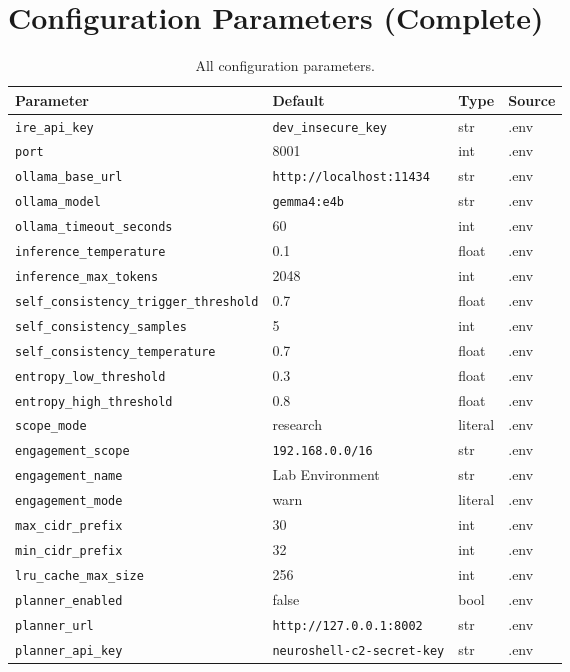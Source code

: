 \documentclass[10pt,journal,onecolumn]{IEEEtran}
\begin{document}
\section{Configuration Parameters (Complete)}
\begin{table}[t]
\caption{All configuration parameters.}
\label{tab:appH}
\begin{tabularx}{\textwidth}{>{\ttfamily}l X l l}
\toprule
\textbf{Parameter} & \textbf{Default} & \textbf{Type} & \textbf{Source}\\
\midrule
\texttt{ire\_api\_key} & \texttt{dev\_insecure\_key} & str & .env\\
\texttt{port} & 8001 & int & .env\\
\texttt{ollama\_base\_url} & \texttt{http://localhost:11434} & str & .env\\
\texttt{ollama\_model} & \texttt{gemma4:e4b} & str & .env\\
\texttt{ollama\_timeout\_seconds} & 60 & int & .env\\
\texttt{inference\_temperature} & 0.1 & float & .env\\
\texttt{inference\_max\_tokens} & 2048 & int & .env\\
\texttt{self\_consistency\_trigger\_threshold} & 0.7 & float & .env\\
\texttt{self\_consistency\_samples} & 5 & int & .env\\
\texttt{self\_consistency\_temperature} & 0.7 & float & .env\\
\texttt{entropy\_low\_threshold} & 0.3 & float & .env\\
\texttt{entropy\_high\_threshold} & 0.8 & float & .env\\
\texttt{scope\_mode} & research & literal & .env\\
\texttt{engagement\_scope} & \texttt{192.168.0.0/16} & str & .env\\
\texttt{engagement\_name} & Lab Environment & str & .env\\
\texttt{engagement\_mode} & warn & literal & .env\\
\texttt{max\_cidr\_prefix} & 30 & int & .env\\
\texttt{min\_cidr\_prefix} & 32 & int & .env\\
\texttt{lru\_cache\_max\_size} & 256 & int & .env\\
\texttt{planner\_enabled} & false & bool & .env\\
\texttt{planner\_url} & \texttt{http://127.0.0.1:8002} & str & .env\\
\texttt{planner\_api\_key} & \texttt{neuroshell-c2-secret-key} & str & .env\\

\end{tabularx}
\end{table}
\end{document}
